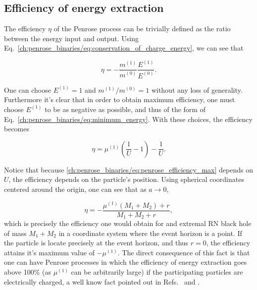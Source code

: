 \subsection{Efficiency of energy extraction}

The efficiency $\eta$ of the Penrose process can be trivially defined as the ratio between the energy input and output. Using Eq.~\eqref{ch:penrose_binaries/eq:conservation_of_charge_energy}, we can see that

\begin{equation}
    \eta = - \frac{m^{(1)}}{m^{(0)}} \frac{E^{(1)}}{E^{(0)}}.
    \label{ch:penrose_binaries/eq:penrose_efficiency_general}
\end{equation}

One can choose $E^{(1)} = 1$ and $m^{(1)}/m^{(0)} = 1$ without any loss of generality. Furthermore it's clear that in order to obtain maximum efficiency, one must choose $E^{(1)}$ to be as negative as possible, and thus of the form of Eq.~\eqref{ch:penrose_binaries/eq:minimum_energy}. With these choices, the efficiency becomes

\begin{equation}
    \eta = \mu^{(1)}\left(\frac{1}{U} - 1\right) - \frac{1}{U}.
    \label{ch:penrose_binaries/eq:penrose_efficiency_max}
\end{equation}

Notice that because \eqref{ch:penrose_binaries/eq:penrose_efficiency_max} depends on $U$, the efficiency depends on the particle's position. Using spherical coordinates centered around the origin, one can see that as $a\rightarrow 0$,

\begin{equation}
    \eta = -\frac{\mu^{(1)}(M_1 + M_2) + r}{M_1 + M_2 + r},
    \label{ch:penrose_binaries/eq:a_zero_efficiency}
\end{equation}
%
which is precisely the efficiency one would obtain for and extremal RN black hole of mass $M_1 + M_2$ in a coordinate system where the event horizon is a point. If the particle is locate precisely at the event horizon, and thus $r = 0$, the efficiency attains it's maximum value of $-\mu^{(1)}$. The direct consequence of this fact is that one can have Penrose processes in which the efficiency of energy extraction goes above 100\% (as $\mu^{(1)}$ can be arbitrarily large) if the participating particles are electrically charged, a well know fact pointed out in Refs.~\cite{bhat1985energetics} and \cite{parthasarathy1986high}.

